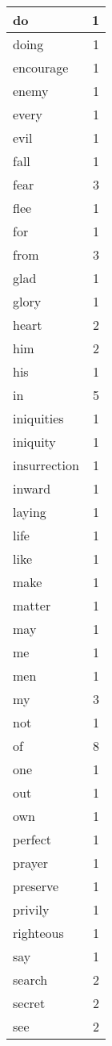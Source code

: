 \begin{center}
\begin{longtable}{l|r}
do & 1 \\ \hline
doing & 1 \\ \hline
encourage & 1 \\ \hline
enemy & 1 \\ \hline
every & 1 \\ \hline
evil & 1 \\ \hline
fall & 1 \\ \hline
fear & 3 \\ \hline
flee & 1 \\ \hline
for & 1 \\ \hline
from & 3 \\ \hline
glad & 1 \\ \hline
glory & 1 \\ \hline
heart & 2 \\ \hline
him & 2 \\ \hline
his & 1 \\ \hline
in & 5 \\ \hline
iniquities & 1 \\ \hline
iniquity & 1 \\ \hline
insurrection & 1 \\ \hline
inward & 1 \\ \hline
laying & 1 \\ \hline
life & 1 \\ \hline
like & 1 \\ \hline
make & 1 \\ \hline
matter & 1 \\ \hline
may & 1 \\ \hline
me & 1 \\ \hline
men & 1 \\ \hline
my & 3 \\ \hline
not & 1 \\ \hline
of & 8 \\ \hline
one & 1 \\ \hline
out & 1 \\ \hline
own & 1 \\ \hline
perfect & 1 \\ \hline
prayer & 1 \\ \hline
preserve & 1 \\ \hline
privily & 1 \\ \hline
righteous & 1 \\ \hline
say & 1 \\ \hline
search & 2 \\ \hline
secret & 2 \\ \hline
see & 2 \\ \hline

\end{longtable}
\end{center}
